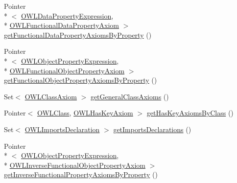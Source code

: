 \begin{DoxyCompactItemize}
\item 
Pointer\\*
$<$ \hyperlink{interfaceorg_1_1semanticweb_1_1owlapi_1_1model_1_1_o_w_l_data_property_expression}{O\-W\-L\-Data\-Property\-Expression}, \\*
\hyperlink{interfaceorg_1_1semanticweb_1_1owlapi_1_1model_1_1_o_w_l_functional_data_property_axiom}{O\-W\-L\-Functional\-Data\-Property\-Axiom} $>$ \hyperlink{interfaceuk_1_1ac_1_1manchester_1_1cs_1_1owl_1_1owlapi_1_1_internals_a7ec02e160f93c539bb0efb877fac04a7}{get\-Functional\-Data\-Property\-Axioms\-By\-Property} ()
\item 
Pointer\\*
$<$ \hyperlink{interfaceorg_1_1semanticweb_1_1owlapi_1_1model_1_1_o_w_l_object_property_expression}{O\-W\-L\-Object\-Property\-Expression}, \\*
\hyperlink{interfaceorg_1_1semanticweb_1_1owlapi_1_1model_1_1_o_w_l_functional_object_property_axiom}{O\-W\-L\-Functional\-Object\-Property\-Axiom} $>$ \hyperlink{interfaceuk_1_1ac_1_1manchester_1_1cs_1_1owl_1_1owlapi_1_1_internals_adfe1dee9406ef607615ec2301b187633}{get\-Functional\-Object\-Property\-Axioms\-By\-Property} ()
\item 
Set$<$ \hyperlink{interfaceorg_1_1semanticweb_1_1owlapi_1_1model_1_1_o_w_l_class_axiom}{O\-W\-L\-Class\-Axiom} $>$ \hyperlink{interfaceuk_1_1ac_1_1manchester_1_1cs_1_1owl_1_1owlapi_1_1_internals_a13a6ac38fec37d614703d062514e85bd}{get\-General\-Class\-Axioms} ()
\item 
Pointer$<$ \hyperlink{interfaceorg_1_1semanticweb_1_1owlapi_1_1model_1_1_o_w_l_class}{O\-W\-L\-Class}, \hyperlink{interfaceorg_1_1semanticweb_1_1owlapi_1_1model_1_1_o_w_l_has_key_axiom}{O\-W\-L\-Has\-Key\-Axiom} $>$ \hyperlink{interfaceuk_1_1ac_1_1manchester_1_1cs_1_1owl_1_1owlapi_1_1_internals_aaec8c7fdc5702db2aaabe381573fa831}{get\-Has\-Key\-Axioms\-By\-Class} ()
\item 
Set$<$ \hyperlink{interfaceorg_1_1semanticweb_1_1owlapi_1_1model_1_1_o_w_l_imports_declaration}{O\-W\-L\-Imports\-Declaration} $>$ \hyperlink{interfaceuk_1_1ac_1_1manchester_1_1cs_1_1owl_1_1owlapi_1_1_internals_a0ad294a78d8fb5e3aed76e91e3991a94}{get\-Imports\-Declarations} ()
\item 
Pointer\\*
$<$ \hyperlink{interfaceorg_1_1semanticweb_1_1owlapi_1_1model_1_1_o_w_l_object_property_expression}{O\-W\-L\-Object\-Property\-Expression}, \\*
\hyperlink{interfaceorg_1_1semanticweb_1_1owlapi_1_1model_1_1_o_w_l_inverse_functional_object_property_axiom}{O\-W\-L\-Inverse\-Functional\-Object\-Property\-Axiom} $>$ \hyperlink{interfaceuk_1_1ac_1_1manchester_1_1cs_1_1owl_1_1owlapi_1_1_internals_a792dfb8bfb0991820f38140c94b7c8e7}{get\-Inverse\-Functional\-Property\-Axioms\-By\-Property} ()

\end{DoxyCompactItemize}

